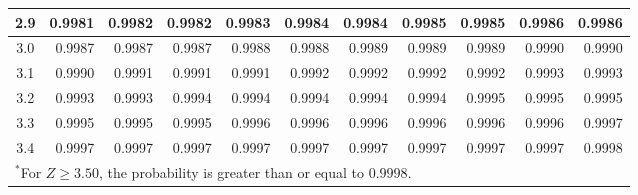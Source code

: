 \begin{table}[H]
\begin{center}
{\begin{tabular}{c | rrrrr | rrrrr |}
  2.9 & \normalsize{0.9981} & \normalsize{0.9982} & \normalsize{0.9982} & \normalsize{0.9983} & \normalsize{0.9984} & \normalsize{0.9984} & \normalsize{0.9985} & \normalsize{0.9985} & \normalsize{0.9986} & \normalsize{0.9986} \\
  \hline
  \hline
  3.0 & \normalsize{0.9987} & \normalsize{0.9987} & \normalsize{0.9987} & \normalsize{0.9988} & \normalsize{0.9988} & \normalsize{0.9989} & \normalsize{0.9989} & \normalsize{0.9989} & \normalsize{0.9990} & \normalsize{0.9990} \\
  3.1 & \normalsize{0.9990} & \normalsize{0.9991} & \normalsize{0.9991} & \normalsize{0.9991} & \normalsize{0.9992} & \normalsize{0.9992} & \normalsize{0.9992} & \normalsize{0.9992} & \normalsize{0.9993} & \normalsize{0.9993} \\
  3.2 & \normalsize{0.9993} & \normalsize{0.9993} & \normalsize{0.9994} & \normalsize{0.9994} & \normalsize{0.9994} & \normalsize{0.9994} & \normalsize{0.9994} & \normalsize{0.9995} & \normalsize{0.9995} & \normalsize{0.9995} \\
  3.3 & \normalsize{0.9995} & \normalsize{0.9995} & \normalsize{0.9995} & \normalsize{0.9996} & \normalsize{0.9996} & \normalsize{0.9996} & \normalsize{0.9996} & \normalsize{0.9996} & \normalsize{0.9996} & \normalsize{0.9997} \\
  3.4 & \normalsize{0.9997} & \normalsize{0.9997} & \normalsize{0.9997} & \normalsize{0.9997} & \normalsize{0.9997} & \normalsize{0.9997} & \normalsize{0.9997} & \normalsize{0.9997} & \normalsize{0.9997} & \normalsize{0.9998} \\
   \hline
\multicolumn{11}{l}{{\normalsize$^*$For $Z \geq 3.50$, the probability is greater than or equal to $0.9998$.}}
\end{tabular}}
\end{center}
\end{table}
